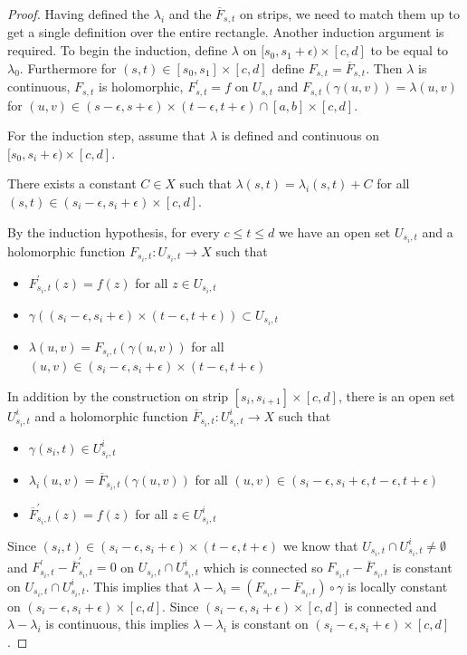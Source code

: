 \begin{proof}
Having defined the $\lambda_i$ and the $\overline{F}_{s,t}$ on strips, we need to match them up to get a single definition over the entire rectangle.   Another induction argument is required.   To begin the induction, define $\lambda$ on $[s_0, s_1+\epsilon) \times [c,d]$ to be equal to $\lambda_0$.  Furthermore for $(s,t) \in [s_0, s_1] \times [c,d]$ define $F_{s,t} = \overline{F}_{s,t}$.   Then $\lambda$ is continuous, $F_{s,t}$ is holomorphic, $F^\prime_{s,t} = f$ on $U_{s,t}$ and $F_{s,t}(\gamma(u,v)) = \lambda(u,v)$ for $(u,v) \in (s - \epsilon, s + \epsilon) \times (t - \epsilon, t + \epsilon) \cap [a,b] \times [c,d]$.
  
  For the induction step, assume that $\lambda$ is defined and continuous on $[s_0, s_i+\epsilon) \times [c,d]$.
  \begin{clm}There exists a constant $C \in X$ such that $\lambda(s, t) = \lambda_i(s, t)+C$ for all $(s,t) \in (s_i-\epsilon, s_i + \epsilon) \times [c,d]$.
  \end{clm}
  By the induction hypothesis, for every $c \leq t \leq d$ we have an
  open set $U_{s_i, t}$ and a holomorphic function $F_{s_i,t} : U_{s_i,t} \to X$ such that
  \begin{itemize}
  \item[(i)] $F^\prime_{s_i,t}(z) = f(z)$ for all  $z \in U_{s_i,t}$
  \item[(ii)] $\gamma((s_i - \epsilon, s_i+ \epsilon) \times (t - \epsilon,    t+\epsilon)) \subset U_{s_i,t}$ 
  \item[(iii)]  $\lambda(u,v) = F_{s_i,t}(\gamma(u,v))$  for all $(u,v) \in    (s_i - \epsilon, s_i+ \epsilon) \times (t - \epsilon,  t+\epsilon)$
  \end{itemize}
 In addition by the construction on strip $[s_i,s_{i+1}] \times [c,d]$, there is an open set $U^i_{s_i,t}$ and a holomorphic function $\overline{F}_{s_i,t} :
 U^i_{s_i,t} \to X$ such that
 \begin{itemize}
 \item[(i)]$\gamma(s_i,t) \in U^i_{s_i,t}$
 \item[(ii)] $\lambda_i(u,v) = \overline{F}_{s_i,t}(\gamma(u,v))$ for all $(u,v) \in (s_i - \epsilon, s_i + \epsilon, t-\epsilon, t+ \epsilon)$
 \item[(iii)] $\overline{F}^\prime_{s_i,t}(z) = f(z)$ for all  $z \in U^i_{s_i,t}$
 \end{itemize}
 Since $(s_i,t) \in (s_i - \epsilon, s_i+ \epsilon) \times (t - \epsilon, t+\epsilon)$
  we know that $U_{s_i,t} \cap U^i_{s_i,t} \neq \emptyset$ and $F^\prime_{s_i,t} - \overline{F}^\prime_{s_i,t} = 0$ on $U_{s_i,t} \cap U^i_{s_i,t}$ which is connected so $F_{s_i,t} - \overline{F}_{s_i,t}$ is constant on $U_{s_i,t} \cap U^i_{s_i,t}$.   This implies that $\lambda - \lambda_i = \left(F_{s_i,t} - \overline{F}_{s_i,t}\right) \circ \gamma$ is locally constant on $(s_i-\epsilon, s_i + \epsilon) \times [c,d]$.  Since $ (s_i-\epsilon, s_i + \epsilon) \times [c,d]$ is connected and $\lambda- \lambda_i$ is continuous, this implies $\lambda - \lambda_i$ is constant on $(s_i - \epsilon, s_i + \epsilon) \times [c,d]$.
  

\end{proof}
